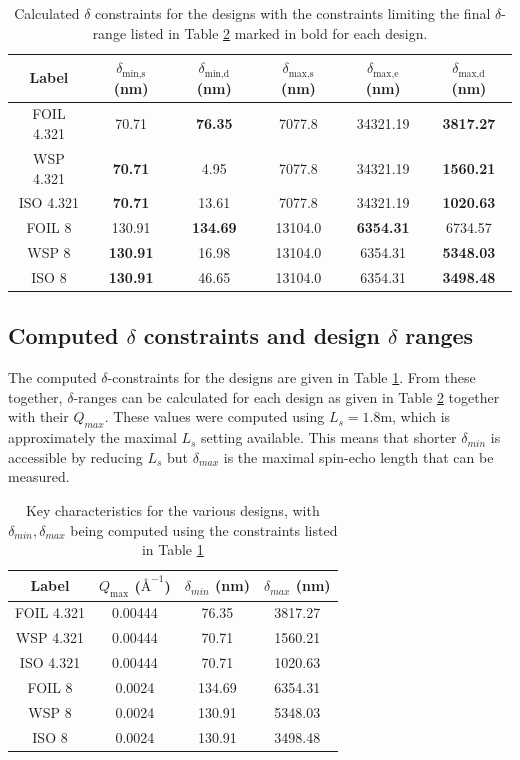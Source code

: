 \documentclass{article}
\begin{document}
\begin{table}[h!]
	\centering
	\begin{tabular}{c | c c | c c c}
		\toprule
		Label & $\delta_{\text{min,s}}$ (nm) & $\delta_{\text{min,d}}$ (nm) & $\delta_{\text{max,s}}$ (nm) & $\delta_{\text{max,e}}$ (nm) & $\delta_{\text{max,d}}$ (nm) \\
		\midrule
		FOIL 4.321 & 70.71 & \textbf{76.35} & 7077.8 & 34321.19 & \textbf{3817.27} \\
		WSP 4.321 & \textbf{70.71} & 4.95 & 7077.8 & 34321.19 & \textbf{1560.21} \\
		ISO 4.321 & \textbf{70.71} & 13.61 & 7077.8 & 34321.19 & \textbf{1020.63} \\
		FOIL 8 & 130.91 & \textbf{134.69} & 13104.0 & \textbf{6354.31} & 6734.57 \\
		WSP 8 & \textbf{130.91} & 16.98 & 13104.0 & 6354.31 & \textbf{5348.03} \\
		ISO 8 & \textbf{130.91} & 46.65 & 13104.0 & 6354.31 & \textbf{3498.48} \\
		\bottomrule
	\end{tabular}
	\caption{Calculated $\delta$ constraints for the designs with the constraints limiting the final $\delta$-range listed in Table \ref{tab:designs-final-ranges} marked in bold for each design.}
	\label{tab:designs-delta-constraints}
\end{table}
\subsection{Computed $\delta$ constraints and design $\delta$ ranges}
\label{c4.2}
The computed $\delta$-constraints for the designs are given in Table \ref{tab:designs-delta-constraints}. From these together, $\delta$-ranges can be calculated for each design as given in Table \ref{tab:designs-final-ranges} together with their $Q_{max}$. These values were computed using $L_s = 1.8\unit\meter$, which is approximately the maximal $L_s$ setting available. This means that shorter $\delta_{min}$ is accessible by reducing $L_s$ but $\delta_{max}$ is the maximal spin-echo length that can be measured.
\begin{table}[h!]
	\centering
	\begin{tabular}{c c c c}
		\toprule
		Label & $Q_{\text{max}}$ ($\text{\AA}^{-1}$) & $\delta_{min}$ (nm) & $\delta_{max}$ (nm) \\
		\midrule
		FOIL 4.321 & 0.00444 & 76.35 & 3817.27 \\
		WSP 4.321 & 0.00444 & 70.71 & 1560.21 \\
		ISO 4.321 & 0.00444 & 70.71 & 1020.63 \\
		FOIL 8 & 0.0024 & 134.69 & 6354.31 \\
		WSP 8 & 0.0024 & 130.91 & 5348.03 \\
		ISO 8 & 0.0024 & 130.91 & 3498.48 \\
		\bottomrule
	\end{tabular}
	\caption{Key characteristics for the various designs, with $\delta_{min}, \delta_{max}$ being computed using the constraints listed in Table \ref{tab:designs-delta-constraints}}
	\label{tab:designs-final-ranges}
\end{table}
\end{document}
